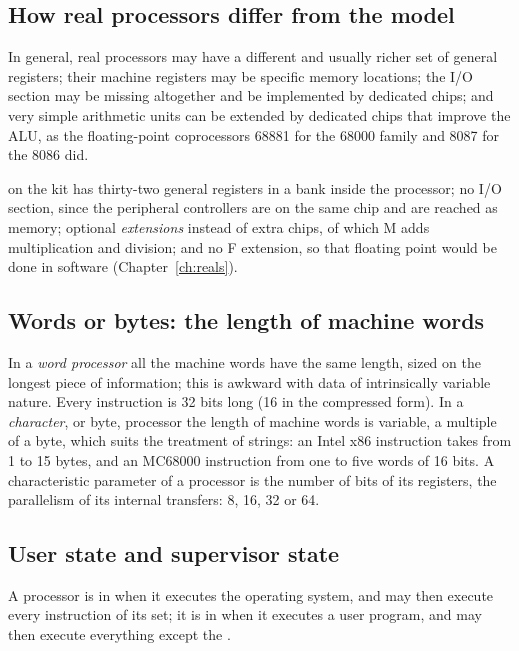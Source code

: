 \subsection{How real processors differ from the model}

In general, real processors may have a different and usually richer set of
general registers; their machine registers may be specific memory locations;
the I/O section may be missing altogether and be implemented by dedicated
chips; and very simple arithmetic units can be extended by dedicated chips
that improve the ALU, as the floating-point coprocessors 68881 for the 68000
family and 8087 for the 8086 did.

\riscv on the \prg kit has thirty-two general registers in a bank inside the
processor; no I/O section, since the peripheral controllers are on the same
chip and are reached as memory; optional \emph{extensions} instead of extra
chips, of which M adds multiplication and division; and no F extension, so
that floating point would be done in software (Chapter~\ref{ch:reals}).

\subsection{Words or bytes: the length of machine words}

In a \emph{word processor} all the machine words have the same length, sized
on the longest piece of information; this is awkward with data of
intrinsically variable nature. Every \riscv instruction is 32 bits long (16
in the compressed form). In a \emph{character}, or byte, processor the length
of machine words is variable, a multiple of a byte, which suits the treatment
of strings: an Intel x86 instruction takes from 1 to 15 bytes, and an MC68000
instruction from one to five words of 16 bits. A characteristic parameter of
a processor is the number of bits of its registers, the parallelism of its
internal transfers: 8, 16, 32 or 64.

\subsection{User state and supervisor state}

A processor is in  when it executes the operating
system, and may then execute every instruction of its set; it is in  when it executes a user program, and may then execute everything
except the .

